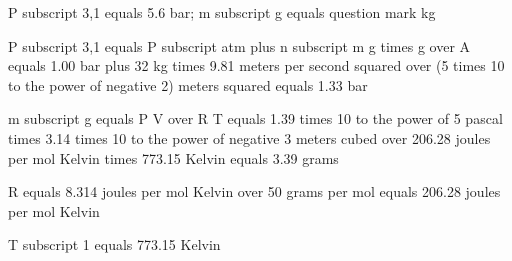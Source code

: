 P subscript 3,1 equals 5.6 bar; m subscript g equals question mark kg

P subscript 3,1 equals P subscript atm plus n subscript m g times g over A equals 1.00 bar plus 32 kg times 9.81 meters per second squared over (5 times 10 to the power of negative 2) meters squared equals 1.33 bar

m subscript g equals P V over R T equals 1.39 times 10 to the power of 5 pascal times 3.14 times 10 to the power of negative 3 meters cubed over 206.28 joules per mol Kelvin times 773.15 Kelvin equals 3.39 grams

R equals 8.314 joules per mol Kelvin over 50 grams per mol equals 206.28 joules per mol Kelvin

T subscript 1 equals 773.15 Kelvin